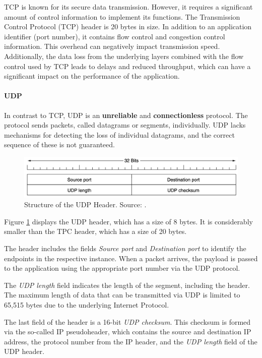 TCP is known for its secure data transmission. However, it requires a significant amount of control information to implement its functions. The Transmission Control Protocol (TCP) header is 20 bytes in size. In addition to an application identifier (port number), it contains flow control and congestion control information. This overhead can negatively impact transmission speed. Additionally, the data loss from the underlying layers combined with the flow control used by TCP leads to delays and reduced throughput, which can have a significant impact on the performance of the application.

\paragraph{UDP}

In contrast to TCP, UDP is an \textbf{unreliable} and \textbf{connectionless} protocol. The protocol sends packets, called datagrams or segments, individually. UDP lacks mechanisms for detecting the loss of individual datagrams, and the correct sequence of these is not guaranteed.

\begin{figure}[h]
    \centering
    \includegraphics[width=1\linewidth]{figures/tcpip_refmodel/image6.png}
    \caption[Structure of the UDP Header]{Structure of the UDP Header. Source: \cite{Tanenbaum2010}.}
    \label{fig:UDPHeader}
\end{figure}

Figure \ref{fig:UDPHeader} displays the UDP header, which has a size of 8 bytes. It is considerably smaller than the TPC header, which has a size of 20 bytes.

The header includes the fields \textit{Source port} and \textit{Destination port} to identify the endpoints in the respective instance. When a packet arrives, the payload is passed to the application using the appropriate port number via the UDP protocol.

The \textit{UDP length} field indicates the length of the segment, including the header. The maximum length of data that can be transmitted via UDP is limited to 65,515 bytes due to the underlying Internet Protocol.

The last field of the header is a 16-bit \textit{UDP checksum}. This checksum is formed via the so-called IP pseudoheader, which contains the source and destination IP address, the protocol number from the IP header, and the \textit{UDP length} field of the UDP header.

